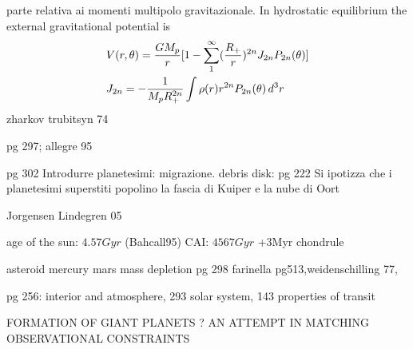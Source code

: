 \begin{workout}
parte relativa ai momenti multipolo gravitazionale. 
In hydrostatic equilibrium the external gravitational potential is
\begin{align}
&V(r,\theta)=\frac{GM_p}{r}[1-\sum_1^{\infty}(\frac{R_+}{r})^{2n}J_{2n}P_{2n}(\theta)]\\
&J_{2n}=-\frac{1}{M_pR_+^{2n}}\int\rho(r) r^{2n}P_{2n}(\theta)\,d^3r
\end{align}
zharkov trubitsyn 74
\end{workout}

\begin{workout}
pg 297; allegre 95
\end{workout}

\begin{workout}
pg 302
Introdurre planetesimi: migrazione.
debris disk: pg 222
Si ipotizza che i planetesimi superstiti popolino la fascia di Kuiper e la nube di Oort

\end{workout}

\begin{workout}
Jorgensen Lindegren 05
\end{workout}

\begin{workout}
age of the sun: $4.57Gyr$ (Bahcall95)
CAI: $4567Gyr$ +3Myr chondrule
\end{workout}

\begin{workout}
asteroid mercury mars mass depletion pg 298
farinella pg513,weidenschilling 77,

\end{workout}

\begin{workout}
pg 256: interior and atmosphere, 293 solar system, 143 properties of transit
\end{workout}


\begin{workout}
FORMATION OF GIANT PLANETS ? AN ATTEMPT IN MATCHING OBSERVATIONAL CONSTRAINTS
\end{workout}

